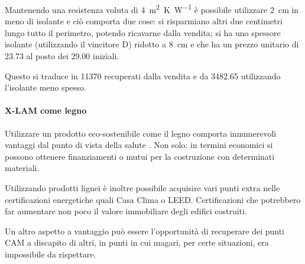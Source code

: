 Mantenendo una resistenza voluta di \SI{4}{\square\metre K\per W} è possibile utilizzare \SI{2}{\centi\metre} in meno di isolante e ciò comporta due cose: si risparmiano altri due centimetri lungo tutto il perimetro, potendo ricavarne dalla vendita; si ha uno spessore isolante (utilizzando il vincitore D) ridotto a \SI{8}{\centi\metre} e che ha un prezzo unitario di \SI{23.73}{\teuro} al posto dei \SI{29.00}{\teuro} iniziali.

Questo si traduce in \SI{11370}{\teuro} recuperati dalla vendita e da \SI{3482.65}{\teuro} utilizzando l'isolante meno spesso.
\paragraph{X-LAM come legno}
Utilizzare un prodotto eco-sostenibile come il legno comporta innumerevoli vantaggi dal punto di vista della salute \cite{EnergyCost}. 
Non solo: in termini economici si possono ottenere finanziamenti o mutui per la costruzione con determinati materiali. 

Utilizzando prodotti lignei è inoltre possibile acquisire vari punti extra nelle certificazioni energetiche quali Casa Clima o LEED. 
Certificazioni che potrebbero far aumentare non poco il valore immobiliare degli edifici costruiti. 

Un altro aspetto a vantaggio può essere l'opportunità di recuperare dei punti CAM a discapito di altri, in punti in cui magari, per certe situazioni, era impossibile da rispettare.
